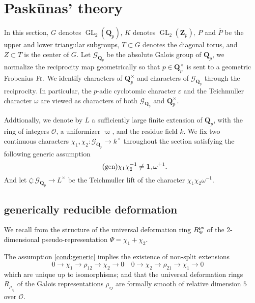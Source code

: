 \documentclass[leqno]{amsart}
\newcommand{\Gp}{\mathcal{G}_{\Qp}} %
\newcommand{\Fr}{\textnormal{Fr}} %
\newcommand{\ps}{\textnormal{ps}}
\DeclareMathOperator{\GL}{GL}
\newcommand{\id}{\mathbf{1}}
\newcommand{\Qp}{\mathbf{Q}_p}
\newcommand{\Zp}{\mathbf{Z}_p}
\newcommand{\oo}{\mathcal{O}} %
\theoremstyle{definition}
\theoremstyle{remark}
\begin{document}
\section{Pask\={u}nas' theory}

In this section,
$G$ denotes  $\GL_2(\Qp)$, 
$K$ denotes  $\GL_2(\Zp)$,  
$P$ and  $\bar{P}$ 
be the upper and lower triangular subgroups,
$T\subset G$ denotes the diagonal torus,
and  $Z\subset T$ is the center of  $G$.
Let  $\Gp$ be the absolute Galois group of  $\Qp$,
we normalize the reciprocity map  geometrically
so that  $p\in \Qp^\times$
is sent to a geometric Frobenius  $\Fr$.
We identify characters of  $\Qp^\times$
and characters of  $\Gp$ through the reciprocity.
In particular, 
the $p$-adic cyclotomic character $\varepsilon$ 
and the Teichmuller character $\omega$
are viewed as characters of both  $\Gp$ and  $\Qp^\times$.

Addtionally,
we denote by $L$ a sufficiently large 
finite extension of  $\Qp$,
with the ring of integers  $\oo$,
a uniformizer  $\varpi$,
and the residue field $k$.
We fix 
two continuous characters
$\chi_1,\chi_2\colon \Gp\to k^\times$ 
throughout the section satisfying
the following generic assumption
\begin{equation}\label{cond:generic}\tag{\text{gen}}
	\chi_1\chi_2^{-1}\neq \id,\omega^{\pm1}.
\end{equation}
And let $\zeta\colon \Gp\to L^\times$
be the Teichmuller lift of the character  $\chi_1\chi_2\omega^{-1}$.



\subsection{generically reducible deformation}

We recall from \cite[\S B.1]{pask}
the structure of the universal deformation ring $R_{\Psi}^{\ps}$
of the $2$-dimensional pseudo-representation $\Psi=\chi_1+\chi_2$. 

The assumption \eqref{cond:generic}
implies the existence of non-split extensions
\begin{equation*}
    0\to \chi_1\to \rho_{12}\to \chi_2\to 0\quad
    0\to \chi_2\to \rho_{21}\to \chi_1\to 0
\end{equation*}
which are unique up to isomorphisms;
and that the universal deformation rings
$R_{\rho_{ij}}$ of the Galois representations $\rho_{ij}$
are formally smooth of relative dimension $5$ over $\oo$.
\end{document}
